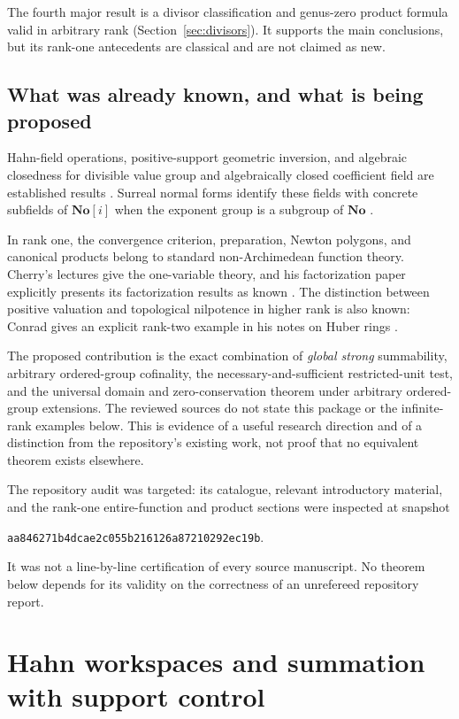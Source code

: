 \documentclass[11pt,letterpaper]{article}
\numberwithin{equation}{section}
\theoremstyle{definition}
\theoremstyle{remark}
\newcommand{\No}{\mathbf{No}}
\newcommand{\repocommit}{aa846271b4dcae2c055b216126a87210292ec19b}
\begin{document}
The fourth major result is a divisor classification and genus-zero product
formula valid in arbitrary rank (Section~\ref{sec:divisors}). It supports the
main conclusions, but its rank-one antecedents are classical and are not
claimed as new.

\subsection{What was already known, and what is being proposed}
Hahn-field operations, positive-support geometric inversion, and algebraic
closedness for divisible value group and algebraically closed coefficient field
are established results \cite{Poonen,Neumann}. Surreal normal forms identify
these fields with concrete subfields of $\No[i]$ when the exponent group is a
subgroup of $\No$ \cite{Gonshor,BournezGuilmant}.

In rank one, the convergence criterion, preparation, Newton polygons, and
canonical products belong to standard non-Archimedean function theory.
Cherry's lectures give the one-variable theory, and his factorization paper
explicitly presents its factorization results as known \cite{CherryLectures,CherryFactorization}.
The distinction between positive valuation and topological nilpotence in
higher rank is also known: Conrad gives an explicit rank-two example in his
notes on Huber rings \cite[Section~6.2]{Conrad}.

The proposed contribution is the exact combination of \emph{global strong}
summability, arbitrary ordered-group cofinality, the necessary-and-sufficient
restricted-unit test, and the universal domain and zero-conservation theorem
under arbitrary ordered-group extensions. The reviewed sources do not state
this package or the infinite-rank examples below. This is evidence of a useful
research direction and of a distinction from the repository's existing work,
not proof that no equivalent theorem exists elsewhere.

The repository audit was targeted: its catalogue, relevant introductory
material, and the rank-one entire-function and product sections were inspected
at snapshot
\begin{center}\small\texttt{\repocommit}.\end{center}
It was not a line-by-line certification of every source manuscript. No theorem
below depends for its validity on the correctness of an unrefereed repository
report.

\section{Hahn workspaces and summation with support control}\label{sec:support}
\end{document}
